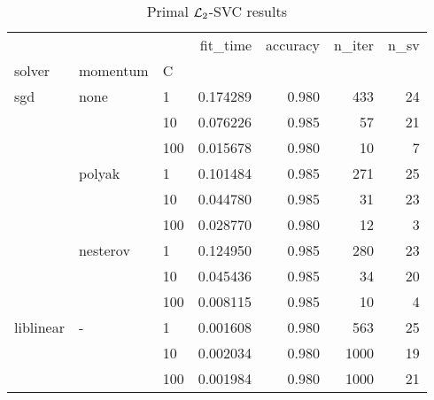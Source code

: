 \begin{table}[H]
\centering
\caption{Primal $\protect \mathcal{L}_2$-SVC results}
\label{primal_l2_svc_cv_results}
\begin{tabular}{lllrrrr}
\toprule
          &   &     &  fit\_time &  accuracy &  n\_iter &  n\_sv \\
solver & momentum & C &           &           &         &       \\
\midrule
sgd & none & 1   &  0.174289 &     0.980 &     433 &    24 \\
          &   & 10  &  0.076226 &     0.985 &      57 &    21 \\
          &   & 100 &  0.015678 &     0.980 &      10 &     7 \\
          & polyak & 1   &  0.101484 &     0.985 &     271 &    25 \\
          &   & 10  &  0.044780 &     0.985 &      31 &    23 \\
          &   & 100 &  0.028770 &     0.980 &      12 &     3 \\
          & nesterov & 1   &  0.124950 &     0.985 &     280 &    23 \\
          &   & 10  &  0.045436 &     0.985 &      34 &    20 \\
          &   & 100 &  0.008115 &     0.985 &      10 &     4 \\
liblinear & - & 1   &  0.001608 &     0.980 &     563 &    25 \\
          &   & 10  &  0.002034 &     0.980 &    1000 &    19 \\
          &   & 100 &  0.001984 &     0.980 &    1000 &    21 \\
\bottomrule
\end{tabular}
\end{table}
